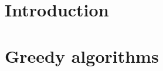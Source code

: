 \documentclass{llncs}
\begin{document}
    \maketitle\clearpage

    \section{Introduction}
    

    \section{Greedy algorithms}
    

    
    
\end{document}
